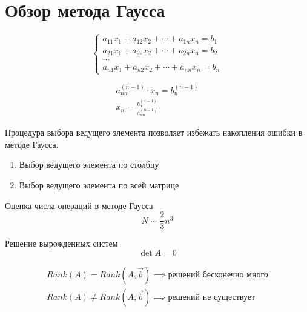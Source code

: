 \section{Обзор метода Гаусса}
\[
\begin{cases}
  a_{11}x_1 + a_{12}x_2 + \cdots + a_{1n}x_n = b_1 \\
  a_{21}x_1 + a_{22}x_2 + \cdots + a_{2n}x_n = b_2 \\
  \dots                                        \\
  a_{n1}x_1 + a_{n2}x_2 + \cdots + a_{nn}x_n = b_n
\end{cases}
\]

\begin{gather*}
  a_{nn}^{(n - 1)} \cdot x_n = b_n^{(n - 1)} \\
  x_n = \frac{b_n^{(n - 1)}}{a_{nn}^{(n - 1)}}
\end{gather*}

\begin{note}
  Процедура выбора ведущего элемента позволяет избежать накопления ошибки в методе Гаусса.
  \begin{enumerate}
  \item Выбор ведущего элемента по столбцу
  \item Выбор ведущего элемента по всей матрице
  \end{enumerate}
\end{note}

\begin{note}
  Оценка числа операций в методе Гаусса 
  \[
    N \sim \frac 23 n^3
  \]
\end{note}

\noindent
Решение вырожденных систем
\[
  \det{A} = 0
\]

\begin{note}
  \begin{gather*}
    Rank(A) = Rank(A, \vec{b}) \implies \text{решений бесконечно много} \\
    Rank(A) \neq Rank(A, \vec{b}) \implies \text{решений не существует}
  \end{gather*}
\end{note}

